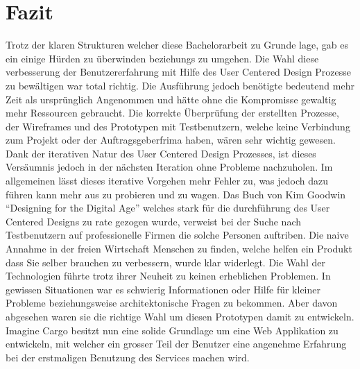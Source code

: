 \chapter{Fazit}
\label{sec:fazit}
Trotz der klaren Strukturen welcher diese Bachelorarbeit zu Grunde lage, gab es ein einige Hürden zu überwinden beziehungs zu umgehen. Die Wahl diese verbesserung der Benutzererfahrung mit Hilfe des User Centered Design Prozesse zu bewältigen war total richtig. Die Ausführung jedoch benötigte bedeutend mehr Zeit als ursprünglich Angenommen und hätte ohne die Kompromisse gewaltig mehr Ressourcen gebraucht. Die korrekte Überprüfung der erstellten Prozesse, der Wireframes und des Prototypen mit Testbenutzern, welche keine Verbindung zum Projekt oder der Auftragsgeberfrima haben, wären sehr wichtig gewesen. Dank der iterativen Natur des User Centered Design Prozesses, ist dieses Versäumnis jedoch in der nächsten Iteration ohne Probleme nachzuholen. Im allgemeinen lässt dieses iterative Vorgehen mehr Fehler zu, was jedoch dazu führen kann mehr aus zu probieren und zu wagen. Das Buch von Kim Goodwin “Designing for the Digital Age” welches stark für die durchführung des User Centered Designs zu rate gezogen wurde, verweist bei der Suche nach Testbenutzern auf professionelle Firmen die solche Personen auftriben. Die naive Annahme in der freien Wirtschaft Menschen zu finden, welche helfen ein Produkt dass Sie selber brauchen zu verbessern, wurde klar widerlegt.
Die Wahl der Technologien führte trotz ihrer Neuheit zu keinen erheblichen Problemen. In gewissen Situationen war es schwierig Informationen oder Hilfe für kleiner Probleme beziehungsweise architektonische Fragen zu bekommen. Aber davon abgesehen waren sie die richtige Wahl um diesen Prototypen damit zu entwickeln. Imagine Cargo besitzt nun eine solide Grundlage um eine Web Applikation zu entwickeln, mit welcher ein grosser Teil der Benutzer eine angenehme Erfahrung bei der erstmaligen Benutzung des Services machen wird.

